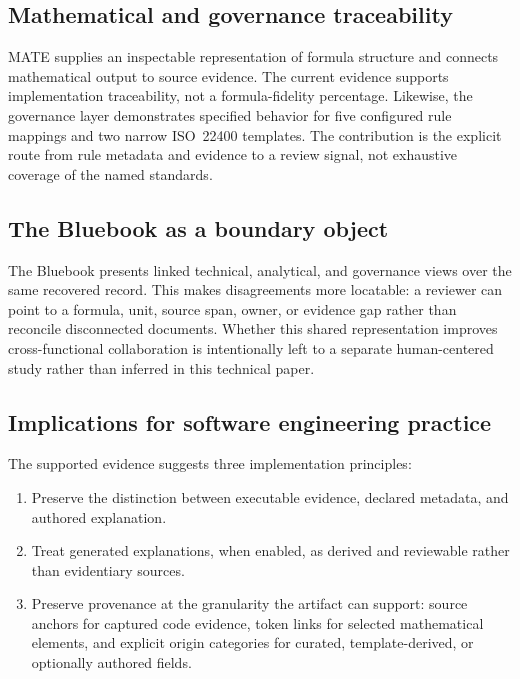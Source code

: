 \documentclass[a4paper,fleqn]{cas-dc}
\begin{document}
\subsection{Mathematical and governance traceability}

MATE supplies an inspectable representation of formula structure and connects mathematical output to source evidence. The current evidence supports implementation traceability, not a formula-fidelity percentage. Likewise, the governance layer demonstrates specified behavior for five configured rule mappings and two narrow ISO~22400 templates. The contribution is the explicit route from rule metadata and evidence to a review signal, not exhaustive coverage of the named standards.

\subsection{The Bluebook as a boundary object}

The Bluebook presents linked technical, analytical, and governance views over the same recovered record. This makes disagreements more locatable: a reviewer can point to a formula, unit, source span, owner, or evidence gap rather than reconcile disconnected documents. Whether this shared representation improves cross-functional collaboration is intentionally left to a separate human-centered study rather than inferred in this technical paper.

\subsection{Implications for software engineering practice}

The supported evidence suggests three implementation principles:

\begin{enumerate}[leftmargin=*]
  \item Preserve the distinction between executable evidence, declared metadata, and authored explanation.
  \item Treat generated explanations, when enabled, as derived and reviewable rather than evidentiary sources.
  \item Preserve provenance at the granularity the artifact can support: source anchors for captured code evidence, token links for selected mathematical elements, and explicit origin categories for curated, template-derived, or optionally authored fields.
\end{enumerate}
\end{document}
